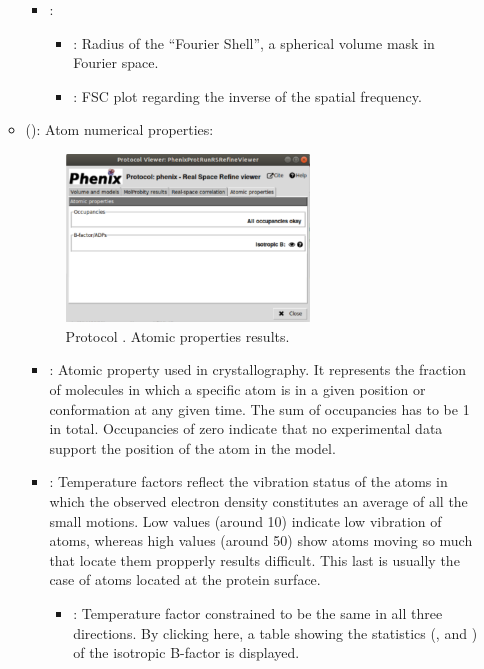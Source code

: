 \begin{itemize}
\begin{itemize}
\begin{itemize}
         \item {}:
          \begin{itemize}
           \item {}: Radius of the ``Fourier Shell'', a spherical volume mask in Fourier space.
           \item {}: FSC plot regarding the inverse of the spatial frequency.
          \end{itemize}
        \end{itemize}
      \item {} (): Atom numerical properties:
       \begin{figure}[H]
         \centering 
         \captionsetup{width=.7\linewidth} 
         \includegraphics[width=0.65\textwidth]{Images_appendix/Fig152.pdf}
         \caption{Protocol . Atomic properties results.}
         \label{fig:app_protocol_real_space_refine_5}
        \end{figure}
        \begin{itemize}
         \item {}: Atomic property used in crystallography. It represents the fraction of molecules in which a specific atom is in a given position or conformation at any given time. The sum of occupancies has to be 1 in total. Occupancies of zero indicate that no experimental data support the position of the atom in the model.
         \item {}: Temperature factors reflect the vibration status of the atoms in which the observed electron density constitutes an average of all the small motions. Low values (around 10) indicate low vibration of atoms, whereas high values (around 50) show atoms moving so much that locate them propperly results difficult. This last is usually the case of atoms located at the protein surface.
          \begin{itemize}
           \item {}: Temperature factor constrained to be the same in all three directions. By clicking here, a table showing the statistics (,  and ) of the isotropic B-factor is displayed.
          \end{itemize}
        \end{itemize}
    \end{itemize}
    

\end{itemize}
